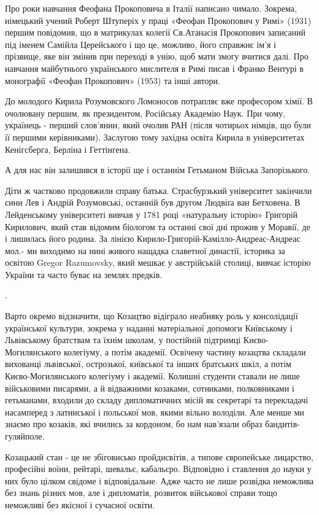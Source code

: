 Про роки навчання Феофана Прокоповича в Італії написано чимало. Зокрема,
німецький учений Роберт Штуперіх у праці «Феофан Прокопович у Римі» (1931)
першим повідомив, що в матрикулах колегії Св.Атанасія Прокопович записаний під
іменем Самійла Церейського і що це, можливо, його справжнє ім'я і прізвище, яке
він змінив при переході в унію, щоб мати змогу вчитися далі. Про навчання
майбутнього українського мислителя в Римі писав і Франко Вентурі в монографії
«Феофан Прокопович» (1953) та інші автори.

До молодого Кирила Розумовского Ломоносов потрапляє вже професором хімії. В
очолювану першим, як президентом, Російську Академію Наук. При чому, українець
- перший слов'янин, який очолив РАН (після чотирьох німців, що були її першими
керівниками). Заслугою тому західна освіта Кирила в університетах Кенігсберга,
Берліна і Геттінгена. 

А для нас він залишився в історії ще і останнім Гетьманом Війська Запорізького. 

Діти ж частково продовжили справу батька. Страсбурзький університет закінчили
сини Лев і Андрій Розумовські, останній був другом Людвіґа ван Бетховена. В
Лейденському університеті вивчав у 1781 році «натуральну історію» Григорій
Кирилович, який став відомим біологом та останні свої дні прожив у Моравії, де
і лишилась його родина. За лінією Кирило-Григорій-Камілло-Андреас-Андреас мол.-
ми виходимо на нині живого нащадка славетної династії, історика за освітою
Gregor Razumovsky, який мешкає у австрійській столиці, вивчає історію України
та часто буває на землях предків.

.

Варто окремо відзначити, що Козацтво відіграло неабияку роль у консолідації
української культури, зокрема у наданні матеріальної допомоги Київському і
Львівському братствам та їхнім школам, у постійній підтримці
Києво-Могилянського колегіуму, а потім академії. Освічену частину козацтва
складали вихованці львівської, острозької, київської та інших братських шкіл, а
потім Києво-Могилянського колегіуму і академії. Колишні студенти ставали не
лише військовими писарями, а й відважними козаками, сотниками, полковниками і
гетьманами, входили до складу дипломатичних місій як секретарі та перекладачі
насамперед з латинської і польської мов, якими вільно володіли. Але менше ми
знаємо про козаків, які вчились за кордоном, бо нам нав'язали образ
бандитів-гуляйполе. 

Козацький стан - це не збіговисько пройдисвітів, а типове європейське
лицарство, професійні воїни, рейтарі, шевальє, кабальєро. Відповідно і
ставлення до науки у них було цілком свідоме і відповідальне. Адже часто не
лише розвідка неможлива без знань різних мов, але і дипломатія, розвиток
військової справи тощо неможливі без якісної і сучасної освіти. 

